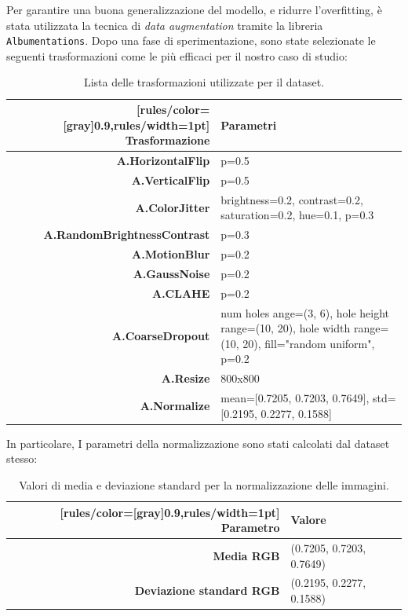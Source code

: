 \documentclass[minted, draw]{../tex/hebdomon}
\begin{document}
Per garantire una buona generalizzazione del modello, e ridurre l'overfitting, è stata utilizzata la tecnica di \textit{data augmentation} tramite la libreria \texttt{Albumentations}. Dopo una fase di sperimentazione, sono state selezionate le seguenti trasformazioni come le più efficaci per il nostro caso di studio:

%
\begin{table}[H]
	\begin{NiceTabular}{rX}[rules/color=[gray]{0.9},rules/width=1pt]
		\CodeBefore
		\Body
		\toprule
		\textbf{Trasformazione}      & \textbf{Parametri}                                \\
		\midrule
		\textbf{A.HorizontalFlip} & p=0.5          \\
		\textbf{A.VerticalFlip}   & p=0.5        \\
		\textbf{A.ColorJitter} & brightness=0.2, contrast=0.2, saturation=0.2, hue=0.1, p=0.3\\
		\textbf{A.RandomBrightnessContrast} & p=0.3\\
		\textbf{A.MotionBlur} & p=0.2\\
		\textbf{A.GaussNoise} & p=0.2\\
		\textbf{A.CLAHE} & p=0.2 \\
		\textbf{A.CoarseDropout} & num holes ange=(3, 6), hole height range=(10, 20), hole width range=(10, 20), fill="random uniform", p=0.2 \\
		\textbf{A.Resize} & 800x800 \\
		\textbf{A.Normalize} & mean=[0.7205, 0.7203, 0.7649], std=[0.2195, 0.2277, 0.1588] \\
		\bottomrule
	\end{NiceTabular}
	\caption{Lista delle trasformazioni utilizzate per il dataset.}
\end{table}
%

In particolare, I parametri della normalizzazione sono stati calcolati dal dataset stesso:
\begin{table}[!ht]
	\begin{NiceTabular}{rX}[rules/color=[gray]{0.9},rules/width=1pt]
		\CodeBefore
		\Body
		\toprule
		\textbf{Parametro}      & \textbf{Valore}                                \\
		\midrule
		\textbf{Media RGB} & (0.7205, 0.7203, 0.7649) \\
		\textbf{Deviazione standard RGB} & (0.2195, 0.2277, 0.1588) \\
		\bottomrule
	\end{NiceTabular}
	\caption{Valori di media e deviazione standard per la normalizzazione delle immagini.}
\end{table}
\end{document}
